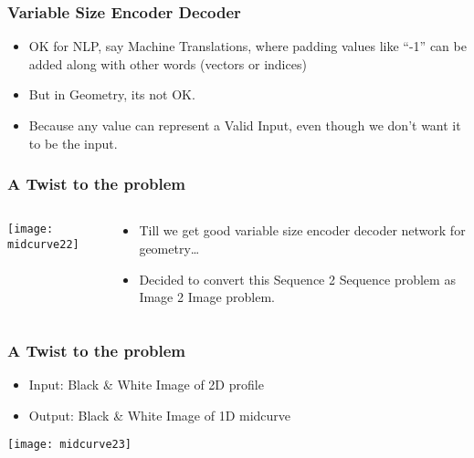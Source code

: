 \begin{frame}[fragile]\frametitle{Variable Size Encoder Decoder}

	\begin{itemize}
	\item OK for NLP, say Machine Translations, where padding values like ``-1'' can be added along with other words (vectors or indices)
	\item But in Geometry, its not OK. 
	\item Because any value can represent a Valid Input, even though we don’t want it to be the input.
	\end{itemize}
	
\end{frame}

\begin{frame}[fragile]\frametitle{A Twist to the problem}

  \begin{columns}
    \begin{column}{0.4\linewidth}
      \centering
      \texttt{[image: midcurve22]}
    \end{column}
    \begin{column}{0.6\linewidth}
	\begin{itemize}
	\item Till we get good variable size encoder decoder network for geometry…
	\item Decided to convert this Sequence 2 Sequence problem as Image 2 Image problem.
	\end{itemize}
    \end{column}
  \end{columns}
  \end{frame}
  
\begin{frame}[fragile]\frametitle{A Twist to the problem}

	\begin{itemize}
	\item Input: Black \& White Image of 2D profile
	\item Output: Black \& White Image of 1D midcurve
	\end{itemize}
\begin{center}
\texttt{[image: midcurve23]}
\end{center}	
\end{frame}

